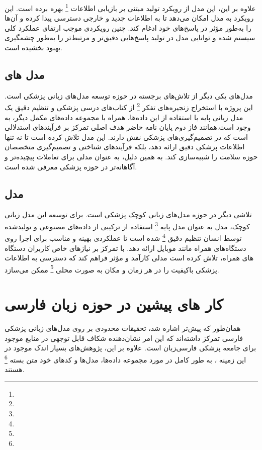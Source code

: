 علاوه بر این، این مدل از رویکرد تولید مبتنی بر بازیابی اطلاعات
\footnote{}
بهره برده است. این رویکرد به مدل امکان می‌دهد تا به اطلاعات جدید و خارجی دسترسی پیدا کرده و آن‌ها را به‌طور مؤثر در پاسخ‌های خود ادغام کند. چنین رویکردی موجب ارتقای عملکرد کلی سیستم شده و توانایی مدل در تولید پاسخ‌هایی دقیق‌تر و مرتبط‌تر را به‌طور چشمگیری بهبود بخشیده است.

\subsection{مدل های 
}
مدل‌های
\cite{b42}
یکی دیگر از تلاش‌های برجسته در حوزه توسعه مدل‌های زبانی پزشکی است. این پروژه با استخراج زنجیره‌های تفکر
\footnote{}
از کتاب‌های درسی پزشکی و تنظیم دقیق یک مدل زبانی پایه با استفاده از این داده‌ها، همراه با مجموعه داده‌های مکمل دیگر، به وجود است.همانند فاز دوم پایان نامه حاضر هدف اصلی
تمرکز بر فرآیندهای استدلالی است که در تصمیم‌گیری‌های پزشکی نقش دارند. این مدل تلاش کرده است تا نه تنها اطلاعات پزشکی دقیق ارائه دهد، بلکه فرآیندهای شناختی و تصمیم‌گیری متخصصان حوزه سلامت را شبیه‌سازی کند. به همین دلیل، 
به عنوان مدلی برای تعاملات پیچیده‌تر و آگاهانه‌تر در حوزه پزشکی معرفی شده است.
\subsection{مدل 
}
\cite{b43}
تلاشی دیگر در حوزه مدل‌های زبانی کوچک پزشکی است. برای توسعه این مدل زبانی کوچک، مدل
\cite{b44}
به عنوان مدل پایه
\footnote{}
استفاده از ترکیبی از داده‌های مصنوعی و تولیدشده توسط انسان تنظیم دقیق
\footnote{}
 شده است تا عملکردی بهینه و مناسب برای اجرا روی دستگاه‌های همراه مانند موبایل ارائه دهد. با تمرکز بر نیازهای خاص کاربران دستگاه های همراه، 
تلاش کرده است مدلی کارآمد و مؤثر فراهم کند که دسترسی به اطلاعات پزشکی باکیفیت را در هر زمان و مکان به صورت محلی 
\footnote{}
ممکن می‌سازد.
\section{کار های پیشین در حوزه زبان فارسی}
همان‌طور که پیش‌تر اشاره شد، تحقیقات محدودی بر روی مدل‌های زبانی پزشکی فارسی تمرکز داشته‌اند که این امر نشان‌دهنده شکاف قابل توجهی در منابع موجود برای جامعه پزشکی فارسی‌زبان است. علاوه بر این، پژوهش‌های بسیار اندک موجود در این زمینه ، به طور کامل در مورد مجموعه داده‌ها، مدل‌ها و کدهای خود متن بسته
\footnote{}
هستند.

